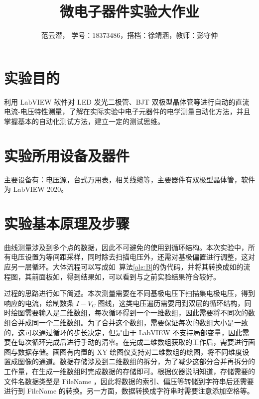 \documentclass[lang=cn,11pt,a4paper,cite=authoryear]{elegantpaper}
\title{微电子器件实验\quad 大作业}
\author{范云潜， 学号：18373486，搭档：徐靖涵，教师：彭守仲}
\institute{微电子学院 184111 班}
\date{\zhtoday}
\begin{document}
\maketitle


\section{实验目的}


利用 LabVIEW 软件对 LED 发光二极管、BJT 双极型晶体管等进行自动的直流电流-电压特性测量，了解在实际实验中电子元器件的电学测量自动化方法，并且掌握基本的自动化测试方法，建立一定的测试思维。

\section{实验所用设备及器件}


主要设备有：电压源，台式万用表，相关线缆等，主要器件有双极型晶体管，软件为 LabVIEW 2020。

\section{实验基本原理及步骤}

曲线测量涉及到多个点的数据，因此不可避免的使用到循环结构。本次实验中，所有电压设置为等间距采样，同时除去扫描电压外，还需对基极偏置进行调整，这对应另一层循环。大体流程可以写成如~算法\ref{alg:B}的伪代码，并将其转换成如的流程图，其前面板如，得到结果如，可以看到与之前实验结果符合较好。

过程的思路进行如下简述。本次测量需要在不同基极电压下扫描集电极电压，得到响应的电流，绘制数条 \(I-V_{C}\) 图线，这类电压遍历需要用到双层的循环结构，同时绘图需要输入是二维数组，每次循环得到一个一维数组，因此需要将不同次的数组合并成同一个二维数组。为了合并这个数组，需要保证每次的数组大小是一致的，这可以通过循环的步长决定，但是由于 LabVIEW 不支持局部变量，因此需要在每次循环完成后进行手动的清零。在完成二维数组获取的工作后，需要进行画图与数据存储。画图有内置的 XY 绘图仪支持对二维数组的绘图，将不同维度设置成图像的通道。数据存储涉及到二维数组的拆分，为了减少这部分合并再拆分的工作量，在生成一维数组时完成数据的存储即可。根据仪器说明知道，存储需要的文件名数据类型是 FileName ，因此将数据的索引、偏压等转储到字符串后还需要进行到 FileName 的转换。另一方面，数据转换成字符串时需要注意添加空格等。


\end{document}
